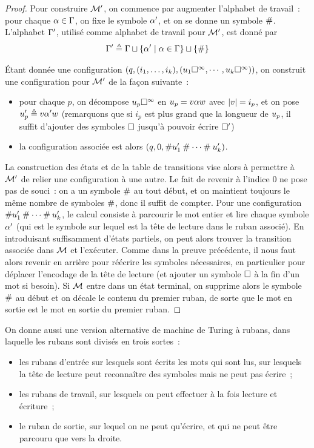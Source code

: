 \begin{proof}
  Pour construire $\mathcal{M}'$, on commence par augmenter l'alphabet de
  travail~:
  pour chaque $\alpha\in\Gamma$, on fixe le symbole $\alpha'$, et on se donne un
  symbole $\mathbin{\#}$. L'alphabet $\Gamma'$, utilisé comme alphabet de travail pour
  $\mathcal{M}'$, est donné par
  \[\Gamma'\triangleq \Gamma\sqcup\left\{ \alpha' \;\middle\vert\; \alpha\in\Gamma \right\}\sqcup\{\mathbin{\#}\}\]
  
  \'Etant donnée une configuration
  $(q,(i_1,\ldots,i_k),(u_1\square^{\infty},\cdots,u_k\square^{\infty}))$, on construit
  une configuration pour $\mathcal{M}'$ de la façon suivante~:
  \begin{itemize}
  \item pour chaque $p$, on décompose $u_p\square^{\infty}$ en
    $u_p = v\alpha w$ avec $\left|v\right| = i_p$, et on
    pose $u_p' \triangleq v\alpha'w$ (remarquons que si
    $i_p$ est plus grand que la longueur de $u_p$, il suffit d'ajouter
    des symboles $\square$ jusqu'à pouvoir écrire $\square'$)
  \item la configuration associée est alors
    $(q,0,\mathbin{\#}u_1'\mathbin{\#}\cdots\mathbin{\#}u_k')$.
  \end{itemize}

  La construction des états et de la table de transitions vise alors à permettre
  à $\mathcal{M}'$ de relier une configuration à une autre. Le fait de revenir à
  l'indice $0$ ne pose pas de souci~: on a un symbole $\mathbin{\#}$ au tout début,
  et on maintient toujours le même nombre de symboles $\mathbin{\#}$, donc il suffit
  de compter. Pour une configuration
  $\mathbin{\#}u_1'\mathbin{\#}\cdots\mathbin{\#}u_k'$, le calcul consiste à
  parcourir le mot entier et lire chaque symbole $\alpha'$ (qui est le symbole
  sur lequel est la tête de lecture dans le ruban associé). En introduisant
  suffisamment d'états partiels, on peut alors trouver la transition associée
  dans $\mathcal{M}$ et l'exécuter. Comme dans la preuve précédente, il nous faut
  alors revenir en arrière pour réécrire les symboles nécessaires, en
  particulier pour déplacer l'encodage de la tête de lecture (et ajouter un
  symbole $\square$ à la fin d'un mot si besoin). Si $\mathcal{M}$ entre dans un état
  terminal, on supprime alors le symbole $\mathbin{\#}$ au début et on décale le
  contenu du premier ruban, de sorte que le mot en sortie est le mot en sortie
  du premier ruban.
\end{proof}

On donne aussi une version alternative de machine de Turing à rubans, dans
laquelle les rubans sont divisés en trois sortes~:
\begin{itemize}
\item les rubans d'entrée sur lesquels sont écrits les mots qui sont lus, sur
  lesquels la tête de lecture peut reconnaître des symboles mais ne peut pas
  écrire~;
\item les rubans de travail, sur lesquels on peut effectuer à la fois lecture et
  écriture~;
\item le ruban de sortie, sur lequel on ne peut qu'écrire, et qui ne peut être
  parcouru que vers la droite.
\end{itemize}

